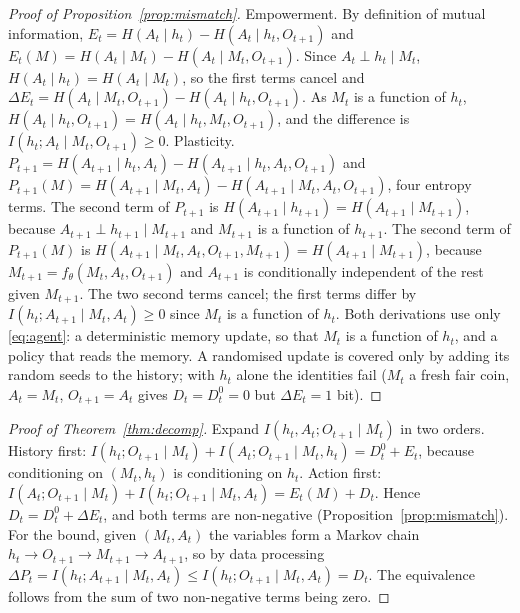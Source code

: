 \documentclass[11pt]{article}
\theoremstyle{plain}
\theoremstyle{definition}
\theoremstyle{remark}
\newcommand{\dE}{\Delta E}
\newcommand{\dP}{\Delta P}
\begin{document}
\begin{proof}[Proof of Proposition~\ref{prop:mismatch}]
Empowerment. By definition of mutual information,
$E_t = H(A_t \mid h_t) - H(A_t \mid h_t, O_{t+1})$ and $E_t(M) = H(A_t \mid M_t) - H(A_t \mid M_t, O_{t+1})$.
Since $A_t \perp h_t \mid M_t$, $H(A_t \mid h_t) = H(A_t \mid M_t)$, so the first terms cancel and
$\dE_t = H(A_t \mid M_t, O_{t+1}) - H(A_t \mid h_t, O_{t+1})$. As $M_t$ is a function of $h_t$, $H(A_t \mid h_t, O_{t+1}) = H(A_t \mid h_t, M_t, O_{t+1})$, and the difference is $I(h_t; A_t \mid M_t, O_{t+1}) \ge 0$.
Plasticity. $P_{t+1} = H(A_{t+1} \mid h_t, A_t) - H(A_{t+1} \mid h_t, A_t, O_{t+1})$ and $P_{t+1}(M) = H(A_{t+1} \mid M_t, A_t) - H(A_{t+1} \mid M_t, A_t, O_{t+1})$, four entropy terms. The second term of $P_{t+1}$ is $H(A_{t+1} \mid h_{t+1}) = H(A_{t+1} \mid M_{t+1})$, because $A_{t+1} \perp h_{t+1} \mid M_{t+1}$ and $M_{t+1}$ is a function of $h_{t+1}$. The second term of $P_{t+1}(M)$ is $H(A_{t+1} \mid M_t, A_t, O_{t+1}, M_{t+1}) = H(A_{t+1} \mid M_{t+1})$, because $M_{t+1} = f_\theta(M_t, A_t, O_{t+1})$ and $A_{t+1}$ is conditionally independent of the rest given $M_{t+1}$. The two second terms cancel; the first terms differ by $I(h_t; A_{t+1} \mid M_t, A_t) \ge 0$ since $M_t$ is a function of $h_t$. Both derivations use only \eqref{eq:agent}: a deterministic memory update, so that $M_t$ is a function of $h_t$, and a policy that reads the memory. A randomised update is covered only by adding its random seeds to the history; with $h_t$ alone the identities fail ($M_t$ a fresh fair coin, $A_t = M_t$, $O_{t+1} = A_t$ gives $D_t = D^0_t = 0$ but $\dE_t = 1$ bit).
\end{proof}

\begin{proof}[Proof of Theorem~\ref{thm:decomp}]
Expand $I(h_t, A_t; O_{t+1} \mid M_t)$ in two orders. History first: $I(h_t; O_{t+1} \mid M_t) + I(A_t; O_{t+1} \mid M_t, h_t) = D^0_t + E_t$, because conditioning on $(M_t, h_t)$ is conditioning on $h_t$. Action first: $I(A_t; O_{t+1} \mid M_t) + I(h_t; O_{t+1} \mid M_t, A_t) = E_t(M) + D_t$. Hence $D_t = D^0_t + \dE_t$, and both terms are non-negative (Proposition~\ref{prop:mismatch}). For the bound, given $(M_t, A_t)$ the variables form a Markov chain $h_t \to O_{t+1} \to M_{t+1} \to A_{t+1}$, so by data processing $\dP_t = I(h_t; A_{t+1} \mid M_t, A_t) \le I(h_t; O_{t+1} \mid M_t, A_t) = D_t$. The equivalence follows from the sum of two non-negative terms being zero.
\end{proof}
\end{document}
